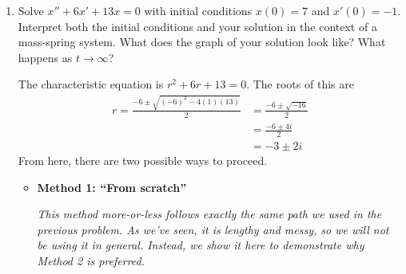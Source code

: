 \documentclass[main]{subfiles}
\begin{document}
\begin{enumerate}[resume]
  \item 
 
  \begin{problem}[\vfill]
  Solve $x'' + 6x' + 13x = 0$ with initial conditions $x(0) = 7$ and
  $x'(0) = -1$.  Interpret both the initial conditions and your solution
  in the context of a mass-spring system.  What does the graph of your solution look like? What happens as $t \to \infty$?
  \end{problem}

  \begin{solution}
  The characteristic equation is $r^2 + 6r + 13 = 0$.  The roots of this
  are
  \begin{align*}
  r=\frac{-6 \pm \sqrt{(-6)^2 - 4 (1) (13)}}{2} & = \frac{-6 \pm
  \sqrt{-16}}{2} \\
  & = \frac{-6 \pm 4i}{2} \\
  & = -3 \pm 2i
  \end{align*}
  From here, there are two possible ways to proceed.
  \begin{itemize}
    \item \textbf{Method 1: ``From scratch''}

    \textit{This method more-or-less follows exactly the same path we used in the previous problem.  As we've seen, it is lengthy and messy, so we will not be using it in general. Instead, we show it here to demonstrate why Method 2 is preferred.}


\end{itemize}
\end{solution}
\end{enumerate}
\end{document}

